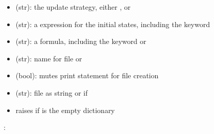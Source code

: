 \documentclass[letterpaper,10pt,english]{sphinxmanual}
\begin{document}
\begin{fulllineitems}
\begin{description}
\begin{itemize}
\item {} 
 (str): the update strategy, either ,  or 

\item {} 
 (str): a {\hyperref[\detokenize{Installation:installation-nusmv}]{}} expression for the initial states, including the keyword 

\item {} 
 (str): a {\hyperref[\detokenize{Installation:installation-nusmv}]{}} formula, including the keyword  or 

\item {} 
 (str): name for  file or 

\item {} 
 (bool): mutes print statement for file creation

\end{itemize}

\item[{\sphinxstylestrong{returns}:}] \leavevmode\begin{itemize}
\item {} 
 (str): file as string or  if 

\item {} 
raises  if  is the empty dictionary

\end{itemize}

\end{description}

:


\end{fulllineitems}
\end{document}
